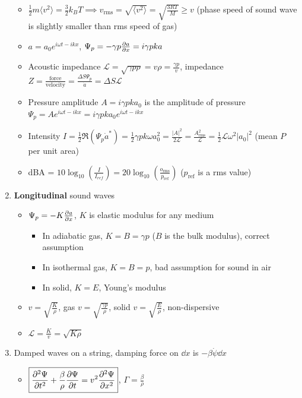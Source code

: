 \documentclass{article}
\theoremstyle{remark}
\theoremstyle{remark}
\newcommand{\realp}[1]{\mathfrak{R}(#1)}
\begin{document}
\begin{enumerate}
\begin{itemize}
        \item $\frac{1}{2}m\langle v^2\rangle = \frac{3}{2}k_B T\implies v_{\text{rms}} = \sqrt{\langle v^2\rangle} = \sqrt{\frac{3RT}{M}} \geq v$ (phase speed of sound wave is slightly smaller than rms speed of gas)
        \item $a = a_0e^{i\omega t-ikx}$, $\Psi_p = -\gamma p\pdv{a}{x} = i\gamma pka$
        \item Acoustic impedance $\boxed{\mathcal{L} = \sqrt{\gamma p\rho} = v\rho = \frac{\gamma p}{v}}$, impedance $Z=\frac{\text{force}}{\text{velocity}}=\frac{\Delta S\Psi_p}{\dot{a}}=\Delta S\mathcal{L}$
        \item Pressure amplitude $A=i\gamma pka_0$ is the amplitude of pressure $\Psi_p = Ae^{i\omega t-ikx} = i\gamma pka_0e^{i\omega t-ikx}$
        \item Intensity $I=\frac{1}{2}\realp{\Psi_p\dot{a}^*}=\frac{1}{2}\gamma pk\omega a_0^2 = \frac{|A|^2}{2\mathcal{L}} = \frac{A^2_{\text{rms}}}{\mathcal{L}} = \frac{1}{2}\mathcal{L}\omega^2|a_0|^2$ (mean $P$ per unit area)
        \item dBA = $10\log_{10}\left(\frac{I}{I_{ref}}\right) = 20\log_{10}\left(\frac{o_{\text{rms}}}{p_{\text{ref}}}\right)$ ($p_{\text{ref}}$ is a rms value)
    \end{itemize}
    \item \textbf{Longitudinal} sound waves\begin{itemize}
        \item $\Psi_p = -K\pdv{a}{x}$, $K$ is elastic modulus for any medium\begin{itemize}
            \item In adiabatic gas, $K=B=\gamma p$ ($B$ is the bulk modulus), correct assumption
            \item In isothermal gas, $K=B=p$, bad assumption for sound in air
            \item In solid, $K=E$, Young's modulus
        \end{itemize}
        \item $v=\sqrt{\frac{K}{\rho}}$, gas $v=\sqrt{\frac{\gamma p}{\rho}}$, solid $v=\sqrt{\frac{E}{\rho}}$, non-dispersive
        \item $\mathcal{L} = \frac{K}{v} = \sqrt{K\rho}$
    \end{itemize}
    \item Damped waves on a string, damping force on $\dd x$ is $-\beta\dot{\psi}\dd x$\begin{itemize}
        \item $\boxed{\pdv[2]{\Psi}{t}+\frac{\beta}{\rho}\pdv{\Psi}{t}=v^2\pdv[2]{\Psi}{x}}$, $\Gamma=\frac{\beta}{\rho}$

\end{itemize}
\end{enumerate}
\end{document}
